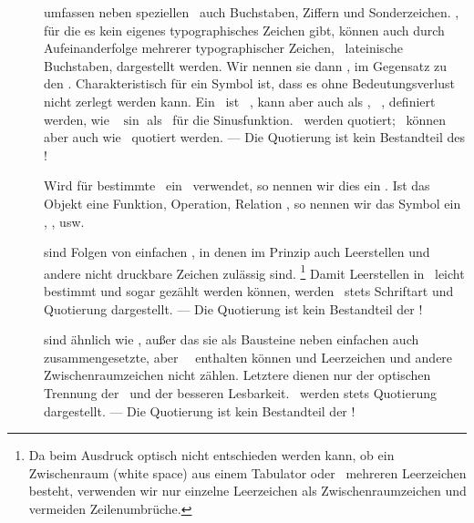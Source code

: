 \begin{description}

	\item [\Symbole] umfassen neben speziellen \Symbolen\ auch Buchstaben, Ziffern und Sonderzeichen.
	\Symbole, für die es kein eigenes typographisches Zeichen gibt, können auch durch Aufeinanderfolge mehrerer typographischer Zeichen, \textiAlg\ lateinische Buchstaben, dargestellt werden.
	Wir nennen sie dann , im Gegensatz zu den .
	Charakteristisch für ein Symbol ist, dass es ohne Bedeutungsverlust nicht zerlegt werden kann.
	Ein \zusammengesetztesSymbol\ ist \textiAlg\ \zerlegbar, kann aber auch als \atomar, \textdh\ \unzerlegbar, definiert werden, wie \textzB\ $\sin$ als \Symbol\ für die Sinusfunktion.
	\Symbole\ werden  quotiert; \zerlegbare\ können aber auch wie \Symbolfolgen\ quotiert werden.
	--- Die Quotierung ist kein Bestandteil des \Symbols!

	Wird für bestimmte \Objekte\ ein \Symbol\ verwendet, so nennen wir dies ein .
	Ist das Objekt eine Funktion, Operation, Relation \textusw, so nennen wir das Symbol ein , ,  usw.

	\item [\Zeichenketten] sind Folgen von einfachen \Symbolen, in denen im Prinzip auch Leerstellen und andere nicht druckbare Zeichen zulässig sind.%
	\footnote{%
		Da beim Ausdruck optisch nicht entschieden werden kann, ob ein Zwischenraum (white space) aus einem Tabulator oder \textevtl\ mehreren Leerzeichen besteht, verwenden wir nur einzelne Leerzeichen als Zwischenraumzeichen und vermeiden Zeilenumbrüche.
	}
	Damit Leerstellen in \Zeichenketten\ leicht bestimmt und sogar gezählt werden können,
	werden \Zeichenketten\ stets  Schriftart und Quotierung dargestellt.
	--- Die Quotierung ist kein Bestandteil der \Zeichenkette!

	\item [\Symbolfolgen] sind ähnlich wie \Zeichenketten, außer das sie als Bausteine neben einfachen auch zusammengesetzte, aber \atomare\ \Symbole\ enthalten können und Leerzeichen und andere Zwischenraumzeichen nicht zählen.
	Letztere dienen nur der optischen Trennung der \Symbole\ und der besseren Lesbarkeit.
	\Symbolfolgen\ werden stets  Quotierung dargestellt.
	--- Die Quotierung ist kein Bestandteil der \Symbolfolge!


\end{description}
